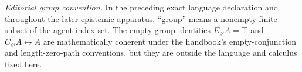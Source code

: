 \noindent\textit{Editorial group convention.}
In the preceding exact language declaration and throughout the later
epistemic apparatus, ``group'' means a nonempty finite subset of the agent
index set.  The empty-group identities
\(E_{\varnothing}A=\top\) and
\(C_{\varnothing}A\leftrightarrow A\) are mathematically coherent under the
handbook's empty-conjunction and length-zero-path conventions, but they are
outside the language and calculus fixed here.

